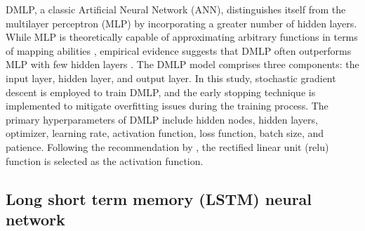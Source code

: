 DMLP, a classic Artificial Neural Network (ANN), distinguishes itself from the multilayer perceptron (MLP) by incorporating a greater number of hidden layers. While MLP is theoretically capable of approximating arbitrary functions in terms of mapping abilities \cite{principe1999neural}, empirical evidence suggests that DMLP often outperforms MLP with few hidden layers \cite{Orimoloye2020, Singh2017}. The DMLP model comprises three components: the input layer, hidden layer, and output layer. In this study, stochastic gradient descent is employed to train DMLP, and the early stopping technique is implemented to mitigate overfitting issues during the training process. The primary hyperparameters of DMLP include hidden nodes, hidden layers, optimizer, learning rate, activation function, loss function, batch size, and patience. Following the recommendation by \cite{Orimoloye2020}, the rectified linear unit (relu) function is selected as the activation function. %

\subsection{Long short term memory (LSTM) neural network}

